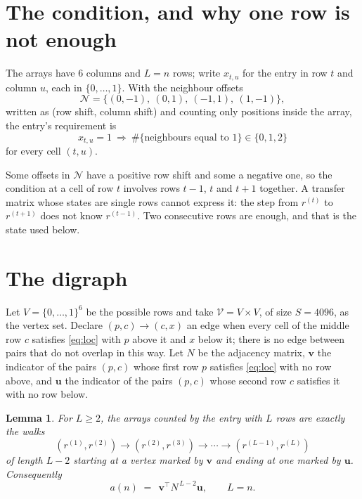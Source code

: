 \documentclass[11pt,a4paper]{article}
\theoremstyle{plain}
\newtheorem{lemma}[theorem]{Lemma}
\theoremstyle{definition}
\begin{document}
\section{The condition, and why one row is not enough}

The arrays have $6$ columns and $L=n$ rows; write $x_{t,u}$ for the entry in
row $t$ and column $u$, each in $\{0,\dots,1\}$. With the neighbour offsets
\[
\mathcal N=\{(0,-1),\ (0,1),\ (-1,1),\ (1,-1)\},
\]
written as (row shift, column shift) and counting only positions inside the array, the
entry's requirement is
\begin{equation}\label{eq:loc}
x_{t,u}=1\ \Rightarrow\ \#\{\text{neighbours equal to }1\}\in\{0,1,2\}
\end{equation}
for every cell $(t,u)$.

Some offsets in $\mathcal N$ have a positive row shift and some a negative one, so the
condition at a cell of row $t$ involves rows $t-1$, $t$ and $t+1$ together. A transfer
matrix whose states are single rows cannot express it: the step from $r^{(t)}$ to
$r^{(t+1)}$ does not know $r^{(t-1)}$. Two consecutive rows are enough, and that is
the state used below.

\section{The digraph}

Let $V=\{0,\dots,1\}^{6}$ be the possible rows and take
$\mathcal V=V\times V$, of size $S=4096$, as the vertex set. Declare $(p,c)\to(c,x)$ an edge
when every cell of the middle row $c$ satisfies \eqref{eq:loc} with $p$ above it and $x$
below it; there is no edge between pairs that do not overlap in this way. Let $N$ be the
adjacency matrix, $\mathbf{v}$ the indicator of the pairs $(p,c)$ whose first row $p$
satisfies \eqref{eq:loc} with no row above, and $\mathbf{u}$ the indicator of
the pairs $(p,c)$ whose second row $c$ satisfies it with no row below.

\begin{lemma}\label{lem:walk}
For $L\ge2$, the arrays counted by the entry with $L$ rows are exactly the walks
\[
(r^{(1)},r^{(2)})\to(r^{(2)},r^{(3)})\to\cdots\to(r^{(L-1)},r^{(L)})
\]
of length $L-2$ starting at a vertex marked by $\mathbf{v}$ and ending at one marked by
$\mathbf{u}$. Consequently
\[
a(n)\;=\;\,\mathbf{v}^{\!\top}N^{\,L-2}\mathbf{u},\qquad L=n .
\]
\end{lemma}
\end{document}
